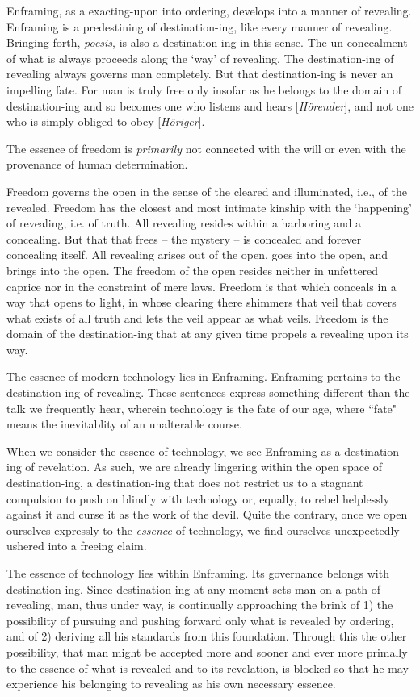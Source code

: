 \documentclass[paper=a4, fontsize=11pt,twoside]{scrartcl}
\begin{document}
Enframing, as a exacting-upon into ordering, develops into a manner of revealing. Enframing is a predestining of destination-ing, like every manner of revealing. Bringing-forth, \textit{po{\-e}sis}, is also a destination-ing in this sense. The un-concealment of what is always proceeds along the `way' of revealing. The destination-ing of revealing always governs man completely. But that destination-ing is never an impelling fate. For man is truly free only insofar as he belongs to the domain of destination-ing and so becomes one who listens and hears [\textit{H{\"o}render}], and not one who is simply obliged to obey [\textit{H{\"o}riger}].

The essence of freedom is \textit{primarily} not connected with the will or even with the provenance of human determination.

Freedom governs the open in the sense of the cleared and illuminated, i.e., of the revealed. Freedom has the closest and most intimate kinship with the `happening' of revealing, i.e. of truth. All revealing resides within a harboring and a concealing. But that that frees -- the mystery -- is concealed and forever concealing itself. All revealing arises out of the open, goes into the open, and brings into the open. The freedom of the open resides neither in unfettered caprice nor in the constraint of mere laws. Freedom is that which conceals in a way that opens to light, in whose clearing there shimmers that veil that covers what exists of all truth and lets the veil appear as what veils. Freedom is the domain of the destination-ing that at any given time propels a revealing upon its way.

The essence of modern technology lies in Enframing. Enframing pertains to the destination-ing of revealing. These sentences express something different than the talk we frequently hear, wherein technology is the fate of our age, where ``fate" means the inevitablity of an unalterable course.

When we consider the essence of technology, we see Enframing as a destination-ing of revelation. As such, we are already lingering within the open space of destination-ing, a destination-ing that does not restrict us to a stagnant compulsion to push on blindly with technology or, equally, to rebel helplessly against it and curse it as the work of the devil. Quite the contrary, once we open ourselves expressly to the \textit{essence} of technology, we find ourselves unexpectedly ushered into a freeing claim.

The essence of technology lies within Enframing. Its governance belongs with destination-ing. Since destination-ing at any moment sets man on a path of revealing, man, thus under way, is continually approaching the brink of 1) the possibility of pursuing and pushing forward only what is revealed by ordering, and of 2) deriving all his standards from this foundation. Through this the other possibility, that man might be accepted more and sooner and ever more primally to the essence of what is revealed and to its revelation, is blocked so that he may experience his belonging to revealing as his own necessary essence.
\end{document}
